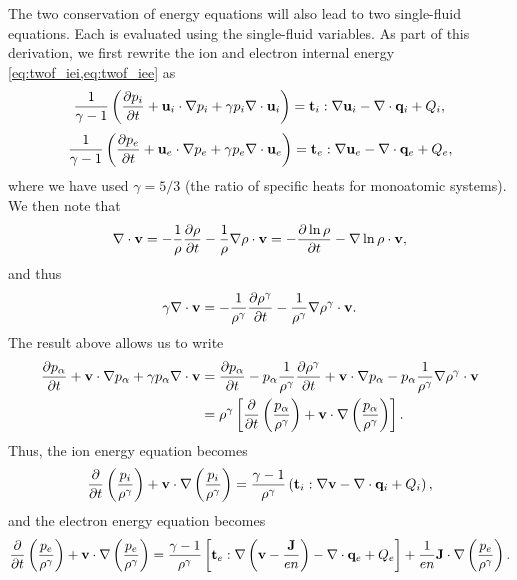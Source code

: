 \documentclass[a4paper,11pt]{report}
\begin{document}
The two conservation of energy equations will also lead to two single-fluid equations. Each is evaluated using the single-fluid variables. As part of this derivation, we first rewrite the ion and electron internal energy \cref{eq:twof_iei,eq:twof_iee} as
\begin{equation}
\label{eq:twof_ie}
    \frac{1}{\gamma-1} \left ( \frac{\partial p_i}{\partial t} + \mathbf{u}_i \cdot \nabla p_i + \gamma p_i \nabla \cdot \mathbf{u}_i \right ) = \mathbf{t}_i : \nabla \mathbf{u}_i - \nabla \cdot \mathbf{q}_i + Q_i,
\end{equation}
\begin{equation}
    \frac{1}{\gamma-1} \left ( \frac{\partial p_e}{\partial t} + \mathbf{u}_e \cdot \nabla p_e + \gamma p_e \nabla \cdot \mathbf{u}_e \right ) = \mathbf{t}_e : \nabla \mathbf{u}_e - \nabla \cdot \mathbf{q}_e + Q_e,
\end{equation}
where we have used $\gamma = 5/3$ (the ratio of specific heats for monoatomic systems). We then note that
\begin{equation}
    \nabla \cdot \mathbf{v} = -\frac{1}{\rho} \frac{\partial \rho}{\partial t} - \frac{1}{\rho} \nabla \rho \cdot \mathbf{v} = - \frac{\partial \ln{\rho} }{\partial t} -  \nabla \ln{\rho} \cdot \mathbf{v},
\end{equation}
and thus
\begin{equation}
    \gamma \nabla \cdot \mathbf{v} = -\frac{1}{\rho^\gamma} \frac{\partial \rho^\gamma}{\partial t} - \frac{1}{\rho^\gamma} \nabla \rho^\gamma \cdot \mathbf{v}.
\end{equation}
The result above allows us to write
\begin{align}
    \frac{\partial p_\alpha}{\partial t} + \mathbf{v} \cdot \nabla p_\alpha + \gamma p_\alpha \nabla \cdot \mathbf{v} 
    &=  \frac{\partial p_\alpha}{\partial t} - p_\alpha \frac{1}{\rho^\gamma} \frac{\partial \rho^\gamma}{\partial t} + \mathbf{v} \cdot \nabla p_\alpha - p_\alpha \frac{1}{\rho^\gamma} \nabla \rho^\gamma \cdot \mathbf{v} \nonumber \\
    & = \rho^\gamma \left [ \frac{\partial}{\partial t} \left ( \frac{p_\alpha}{\rho^\gamma} \right) + \mathbf{v} \cdot \nabla \left (\frac{p_\alpha}{\rho^\gamma} \right) \right ].
\end{align}
Thus, the ion energy equation becomes
\begin{equation}
\label{eq:generalized_MHD_pi}
   \frac{\partial}{\partial t} \left ( \frac{p_i}{\rho^\gamma} \right) + \mathbf{v} \cdot \nabla \left (\frac{p_i}{\rho^\gamma} \right) = \frac{\gamma - 1}{\rho^\gamma} \left( \mathbf{t}_i : \nabla \mathbf{v} - \nabla \cdot \mathbf{q}_i + Q_i \right),
\end{equation}
and the electron energy equation becomes
\begin{equation}
\label{eq:generalized_MHD_pe}
    \frac{\partial}{\partial t} \left ( \frac{p_e}{\rho^\gamma} \right) + \mathbf{v} \cdot \nabla \left (\frac{p_e}{\rho^\gamma} \right) = \frac{\gamma - 1}{\rho^\gamma} \left[ \mathbf{t}_e : \nabla \left (\mathbf{v} -\frac{\mathbf{J}}{e n} \right) - \nabla \cdot \mathbf{q}_e + Q_e \right] + \frac{1}{e n} \mathbf{J} \cdot \nabla \left ( \frac{ p_e}{\rho^\gamma} \right).
\end{equation}
\end{document}

